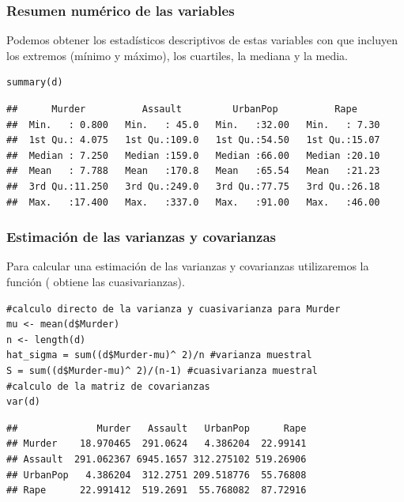 \subsubsection{Resumen numérico de las variables}
Podemos obtener los estadísticos descriptivos de estas variables con  que incluyen los extremos (mínimo y máximo), los cuartiles, la mediana y la media.
\begin{lstlisting}
summary(d)
\end{lstlisting}
\begin{verbatim}
##      Murder          Assault         UrbanPop          Rape
##  Min.   : 0.800   Min.   : 45.0   Min.   :32.00   Min.   : 7.30
##  1st Qu.: 4.075   1st Qu.:109.0   1st Qu.:54.50   1st Qu.:15.07
##  Median : 7.250   Median :159.0   Median :66.00   Median :20.10
##  Mean   : 7.788   Mean   :170.8   Mean   :65.54   Mean   :21.23
##  3rd Qu.:11.250   3rd Qu.:249.0   3rd Qu.:77.75   3rd Qu.:26.18
##  Max.   :17.400   Max.   :337.0   Max.   :91.00   Max.   :46.00
\end{verbatim}
\subsubsection{Estimación de las varianzas y covarianzas}
Para calcular una estimación de las varianzas y covarianzas utilizaremos la función  ( obtiene las cuasivarianzas).

\begin{lstlisting}
#calculo directo de la varianza y cuasivarianza para Murder
mu <- mean(d$Murder)
n <- length(d)
hat_sigma = sum((d$Murder-mu)^ 2)/n #varianza muestral
S = sum((d$Murder-mu)^ 2)/(n-1) #cuasivarianza muestral
#calculo de la matriz de covarianzas
var(d)
\end{lstlisting}

\begin{verbatim}
##              Murder   Assault   UrbanPop      Rape
## Murder    18.970465  291.0624   4.386204  22.99141
## Assault  291.062367 6945.1657 312.275102 519.26906
## UrbanPop   4.386204  312.2751 209.518776  55.76808
## Rape      22.991412  519.2691  55.768082  87.72916
\end{verbatim}

